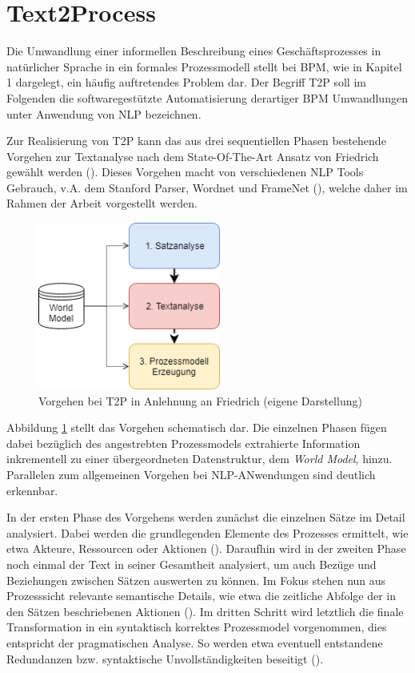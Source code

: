 \section{Text2Process}


Die Umwandlung einer informellen Beschreibung eines Geschäftsprozesses in na\-tür\-li\-cher Sprache in ein formales Prozessmodell stellt bei \ac{BPM}, wie in Kapitel 1 dargelegt, ein häufig auftretendes Problem dar. 
Der Begriff \ac{T2P} soll im Folgenden die softwaregestützte Automatisierung derartiger \ac{BPM} Umwandlungen unter Anwendung von \ac{NLP} bezeichnen.\par
Zur Realisierung von \ac{T2P} kann das aus drei sequentiellen Phasen bestehende Vorgehen zur Textanalyse nach dem State-Of-The-Art Ansatz von Friedrich gewählt werden (\cite[vgl.][4 ff.]{FRIEDRICH2}). Dieses Vorgehen macht von verschiedenen \ac{NLP} Tools Gebrauch, v.A. dem Stanford Parser, Wordnet und FrameNet (\cite[vgl.][11]{RIEFER}), welche daher im Rahmen der Arbeit vorgestellt werden.
\begin{figure}
\includegraphics[width=6cm]{pictures/T2P_highlevel.png}
\caption{Vorgehen bei T2P in Anlehnung an Friedrich (eigene Darstellung)}
\label{fig:T2PHL}
\end{figure}
Abbildung \ref{fig:T2PHL} stellt das Vorgehen schematisch dar. Die einzelnen Phasen fügen dabei bezüglich des angestrebten Prozessmodels extrahierte Information inkrementell zu einer übergeordneten Datenstruktur, dem \textit{World Model}, hinzu. Parallelen zum allgemeinen Vorgehen bei NLP-ANwendungen sind deutlich erkennbar.\par
In der ersten Phase des Vorgehens werden zunächst die einzelnen Sätze im Detail analysiert. Dabei werden die grundlegenden Elemente des Prozesses ermittelt, wie etwa Akteure, Ressourcen oder Aktionen (\cite[vgl.][47 ff.]{FRIEDRICH1}). Daraufhin wird in der zweiten Phase noch einmal der Text in seiner Gesamtheit analysiert, um auch Bezüge und Beziehungen zwischen Sätzen auswerten zu können. Im Fokus stehen nun aus Prozesssicht relevante semantische Details, wie etwa die zeitliche Abfolge der in den Sätzen beschriebenen Aktionen (\cite[vgl.][66 ff.]{FRIEDRICH1}). Im dritten Schritt wird letztlich die finale Transformation in ein syntaktisch korrektes Prozessmodel vorgenommen, dies entspricht der pragmatischen Analyse. So werden etwa  eventuell entstandene Redundanzen bzw. syntaktische Unvollständigkeiten beseitigt (\cite[vgl.][90 ff.]{FRIEDRICH1}).
